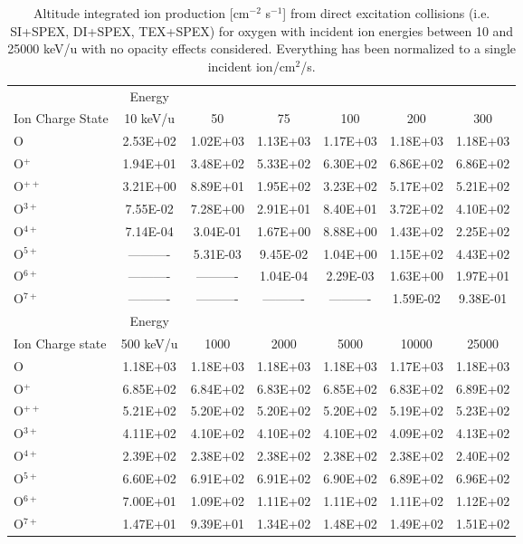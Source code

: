 \begin{table}[ht]
    \centering
    \caption{Altitude integrated ion production [cm$^{-2}$ s$^{-1}$] from direct excitation collisions (i.e. SI+SPEX, DI+SPEX, TEX+SPEX) for oxygen with incident ion energies between 10 and 25000 keV/u with no opacity effects considered. Everything has been normalized to a single incident ion/cm$^2$/s.}
    \begin{tabular}{l|c|c|c|c|c|c}
    \hline
    & Energy & & & & & \\
    Ion Charge State & 10 keV/u & 50 & 75 & 100 & 200 & 300 \\
    \hline
    O & 2.53E+02 & 1.02E+03 & 1.13E+03 & 1.17E+03 & 1.18E+03 & 1.18E+03 \\
    O$^+$ & 1.94E+01 & 3.48E+02 & 5.33E+02 & 6.30E+02 & 6.86E+02 & 6.86E+02 \\
    O$^{++}$ & 3.21E+00 & 8.89E+01 & 1.95E+02 & 3.23E+02 & 5.17E+02 & 5.21E+02 \\
    O$^{3+}$ & 7.55E-02 & 7.28E+00 & 2.91E+01 & 8.40E+01 & 3.72E+02 & 4.10E+02 \\
    O$^{4+}$ & 7.14E-04 & 3.04E-01 & 1.67E+00 & 8.88E+00 & 1.43E+02 & 2.25E+02 \\
    O$^{5+}$ & ---------- & 5.31E-03 & 9.45E-02 & 1.04E+00 & 1.15E+02 & 4.43E+02 \\
    O$^{6+}$ & ---------- & ---------- & 1.04E-04 & 2.29E-03 & 1.63E+00 & 1.97E+01 \\
    O$^{7+}$ & ---------- & ---------- & ---------- & ---------- & 1.59E-02 & 9.38E-01 \\
    \hline
    \hline
    & Energy & & & & & \\
    Ion Charge state & 500 keV/u & 1000 & 2000 & 5000 & 10000 & 25000 \\
    \hline
    O & 1.18E+03 & 1.18E+03 & 1.18E+03 & 1.18E+03 & 1.17E+03 & 1.18E+03 \\
    O$^+$ & 6.85E+02 & 6.84E+02 & 6.83E+02 & 6.85E+02 & 6.83E+02 & 6.89E+02 \\
    O$^{++}$ & 5.21E+02 & 5.20E+02 & 5.20E+02 & 5.20E+02 & 5.19E+02 & 5.23E+02 \\
    O$^{3+}$ & 4.11E+02 & 4.10E+02 & 4.10E+02 & 4.10E+02 & 4.09E+02 & 4.13E+02 \\
    O$^{4+}$ & 2.39E+02 & 2.38E+02 & 2.38E+02 & 2.38E+02 & 2.38E+02 & 2.40E+02 \\
    O$^{5+}$ & 6.60E+02 & 6.91E+02 & 6.91E+02 & 6.90E+02 & 6.89E+02 & 6.96E+02 \\
    O$^{6+}$ & 7.00E+01 & 1.09E+02 & 1.11E+02 & 1.11E+02 & 1.11E+02 & 1.12E+02 \\
    O$^{7+}$ & 1.47E+01 & 9.39E+01 & 1.34E+02 & 1.48E+02 & 1.49E+02 & 1.51E+02 \\
    \hline
    \end{tabular}
    \label{tab:OxyDEProd}
\end{table}


